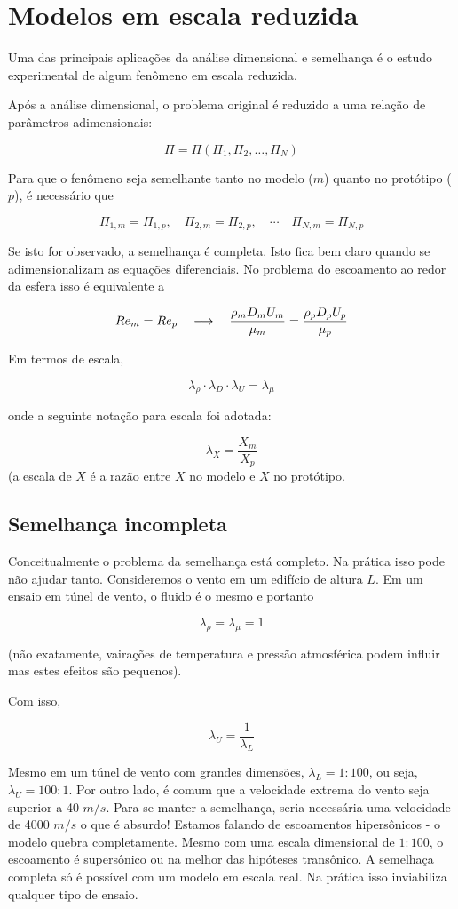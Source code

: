\section{Modelos em escala reduzida}

Uma das principais aplicações da análise dimensional e semelhança é o estudo experimental de algum fenômeno em escala reduzida. 

Após a análise dimensional, o problema original é reduzido a uma relação de parâmetros adimensionais:

\[
\Pi = \Pi\left(\Pi_1, \Pi_2, \ldots, \Pi_N \right)
\]

Para que o fenômeno seja semelhante tanto no modelo ($m$) quanto no protótipo ($p$), é necessário que

\[
\Pi_{1,m} = \Pi_{1,p}, \quad \Pi_{2,m} = \Pi_{2,p}, \quad \cdots \quad \Pi_{N,m} = \Pi_{N,p}
\]

Se isto for observado, a semelhança é completa. Isto fica bem claro quando se adimensionalizam as equações diferenciais. No problema do escoamento ao redor da esfera isso é equivalente a

\[
Re_m = Re_p \quad\longrightarrow\quad \frac{\rho_m D_m U_m}{\mu_m} = \frac{\rho_p D_p U_p}{\mu_p}
\]

Em termos de escala,

\[
\lambda_\rho \cdot \lambda_D \cdot \lambda_U = \lambda_\mu
\]


onde a seguinte notação para escala foi adotada:

\[
\lambda_X = \frac{X_m}{X_p}
\]
(a escala de $X$ é a razão entre $X$ no modelo e $X$ no protótipo.

\subsection{Semelhança incompleta}
Conceitualmente o problema da semelhança está completo. Na prática isso pode não ajudar tanto. Consideremos o vento em um edifício de altura $L$. Em um ensaio em túnel de vento, o fluido é o mesmo e portanto

\[
\lambda_\rho = \lambda_\mu = 1
\]

(não exatamente, vairações de temperatura e pressão atmosférica podem influir mas estes efeitos são pequenos).

Com isso,

\[
\lambda_U = \frac{1}{\lambda_L}
\]

Mesmo em um túnel de vento com grandes dimensões, $\lambda_L = 1:100$, ou seja, $\lambda_U = 100:1$. Por outro lado, é comum que a velocidade extrema do vento seja superior a 40 $m/s$. Para se manter a semelhança, seria necessária uma velocidade de 4000 $m/s$ o que é absurdo! Estamos falando de escoamentos hipersônicos - o modelo quebra completamente. Mesmo com uma escala dimensional de $1:100$, o escoamento é supersônico ou na melhor das hipóteses transônico. A semelhaça completa só é possível com um modelo em escala real. Na prática isso inviabiliza qualquer tipo de ensaio. 

